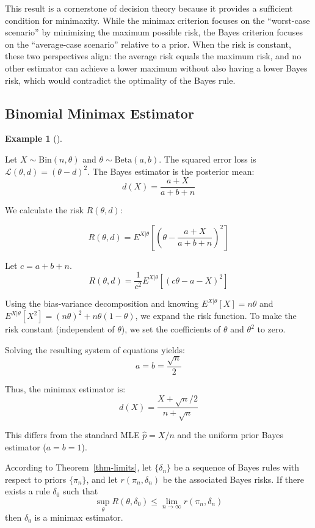 \documentclass[
  letterpaper,
  DIV=11,
  numbers=noendperiod]{scrreprt}
\renewcommand{\[}{\begin{equation}}
\renewcommand{\]}{\end{equation}}
\theoremstyle{definition}
\theoremstyle{plain}
\theoremstyle{plain}
\theoremstyle{plain}
\theoremstyle{definition}
\newtheorem{example}{Example}[chapter]
\theoremstyle{plain}
\theoremstyle{remark}
\begin{document}
This result is a cornerstone of decision theory because it provides a
sufficient condition for minimaxity. While the minimax criterion focuses
on the ``worst-case scenario'' by minimizing the maximum possible risk,
the Bayes criterion focuses on the ``average-case scenario'' relative to
a prior. When the risk is constant, these two perspectives align: the
average risk equals the maximum risk, and no other estimator can achieve
a lower maximum without also having a lower Bayes risk, which would
contradict the optimality of the Bayes rule.

\subsection{Binomial Minimax
Estimator}\label{binomial-minimax-estimator}

\begin{example}[]\protect\hypertarget{exm-binomial-minimax}{}\label{exm-binomial-minimax}

Let \(X \sim \text{Bin}(n, \theta)\) and
\(\theta \sim \text{Beta}(a, b)\). The squared error loss is
\(\mathcal{L}(\theta, d) = (\theta - d)^2\). The Bayes estimator is the
posterior mean: \[d(X) = \frac{a+X}{a+b+n}\]

We calculate the risk \(R(\theta, d)\):

\[
R(\theta, d) = E^{X|\theta} \left[ \left( \theta - \frac{a+X}{a+b+n} \right)^2 \right]
\]

Let \(c = a+b+n\).
\[R(\theta, d) = \frac{1}{c^2} E^{X|\theta} \left[ (c\theta - a - X)^2 \right]\]

Using the bias-variance decomposition and knowing
\(E^{X|\theta}[X] = n\theta\) and
\(E^{X|\theta}[X^2] = (n\theta)^2 + n\theta(1-\theta)\), we expand the
risk function. To make the risk constant (independent of \(\theta\)), we
set the coefficients of \(\theta\) and \(\theta^2\) to zero.

Solving the resulting system of equations yields:
\[a = b = \frac{\sqrt{n}}{2}\]

Thus, the minimax estimator is:
\[d(X) = \frac{X + \sqrt{n}/2}{n + \sqrt{n}}\]

This differs from the standard MLE \(\hat{p} = X/n\) and the uniform
prior Bayes estimator (\(a=b=1\)).

According to Theorem~\ref{thm-limits}, let \(\{\delta_n\}\) be a
sequence of Bayes rules with respect to priors \(\{\pi_n\}\), and let
\(r(\pi_n, \delta_n)\) be the associated Bayes risks. If there exists a
rule \(\delta_0\) such that \[
\sup_{\theta} R(\theta, \delta_0) \le \lim_{n \to \infty} r(\pi_n, \delta_n)
\] then \(\delta_0\) is a minimax estimator.


\end{example}
\end{document}
